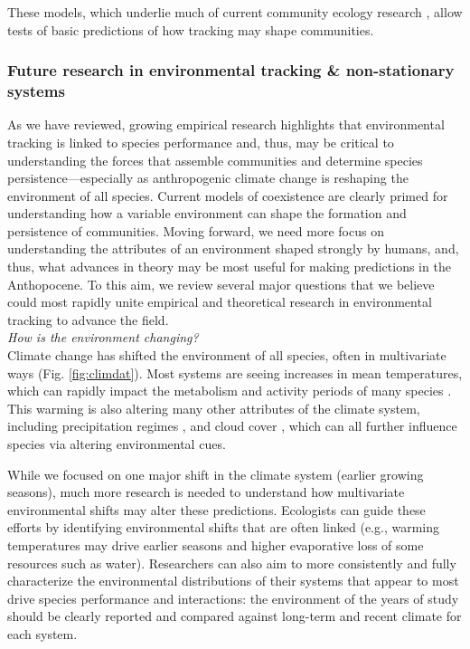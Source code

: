\documentclass[11pt,letterpaper]{article}
\begin{document}
These models, which underlie much of current community ecology research \citep{Mayfield:2010fe,barabas2018,ellner2019}, allow tests of basic predictions of how tracking may shape communities.


\subsubsection{Future research in environmental tracking \& non-stationary systems}
As we have reviewed, growing empirical research highlights that environmental tracking is linked to species performance and, thus, may be critical to understanding the forces that assemble communities and determine species persistence---especially as anthropogenic climate change is reshaping the environment of all species. Current models of coexistence are clearly primed for understanding how a variable environment can shape the formation and persistence of communities. Moving forward, we need more focus on understanding the attributes of an environment shaped strongly by humans, and, thus, what advances in theory may be most useful for making predictions in the Anthopocene. To this aim, we review several major questions that we believe could most rapidly unite empirical and theoretical research in environmental tracking to advance the field.\\ %

\emph{How is the environment changing?} \\ %

Climate change has shifted the environment of all species, often in multivariate ways (Fig. \ref{fig:climdat}). Most systems are seeing increases in mean temperatures, which can rapidly impact the metabolism and activity periods of many species \citep{Monson:2006vt,IPCC:2014sm}. This warming is also altering many other attributes of the climate system, including precipitation regimes \citep{Diffenbaugh2015}, and cloud cover \citep{hofer2017}, which can all further influence species via altering environmental cues. 

While we focused on one major shift in the climate system (earlier growing seasons), much more research is needed to understand how multivariate environmental shifts may alter these predictions. Ecologists can guide these efforts by identifying environmental shifts that are often linked (e.g., warming temperatures may drive earlier seasons and higher evaporative loss of some resources such as water). Researchers can also aim to more consistently and fully characterize the environmental distributions of their systems that appear to most drive species performance and interactions: the environment of the years of study should be clearly reported and compared against long-term and recent climate for each system.\\
\end{document}
